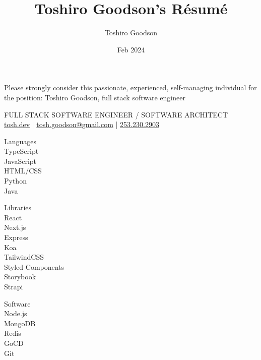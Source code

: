 \documentclass{resume}
\title{Toshiro Goodson's Résumé}
\author{Toshiro Goodson}
\date{Feb 2024}
\begin{document}
\color{content}
\begin{spacing}{1.2}

\begin{paracol}{2}
	\begin{spacing}{0}
	{\tiny Please strongly consider this passionate, experienced, self-managing individual for the position: Toshiro Goodson, full stack software engineer}
	\end{spacing}

	\switchcolumn
	\color{subcontent}
	\begin{spacing}{0.9}
		{\Huge {}}
	\end{spacing}
	FULL STACK SOFTWARE ENGINEER / SOFTWARE ARCHITECT\\
	\href{https://tosh.dev}{tosh.dev} | \href{mailto:tosh.goodson@gmail.com}{tosh.goodson@gmail.com} | \href{tel:2532302903}{253.230.2903}
\end{paracol}

\bigskip
\bigskip
\bigskip

\begin{paracol}{2}
	\begin{flushright}
		\small {}

		\medskip

		{\color{subcontent} \footnotesize Languages}\\
		\smallskip
		TypeScript\\
		JavaScript\\
		HTML/CSS\\
		Python\\
		Java

		\medskip

		{\color{subcontent} \footnotesize Libraries}\\
		\smallskip
		React\\
		Next.js\\
		Express\\
		Koa\\
		TailwindCSS\\
		Styled Components\\
		Storybook\\
		Strapi

		\medskip

		{\color{subcontent} \footnotesize Software}\\
		\smallskip
		Node.js\\
		MongoDB\\
		Redis\\
		GoCD\\
		Git


\end{flushright}
\end{paracol}
\end{spacing}
\end{document}
